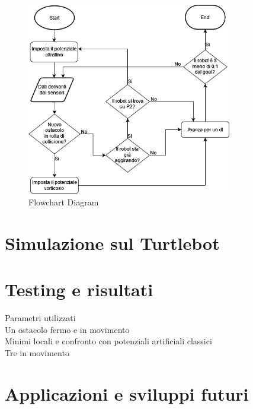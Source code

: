 \documentclass[14pt,twoside,a4paper]{extarticle}
\begin{document}
\begin{figure}[H]
\caption{Flowchart Diagram} \label{flow}
\centering
\includegraphics[width=0.8\textwidth]{flowchartDiagram.png}
\end{figure}

\section{Simulazione sul Turtlebot}

\section{Testing e risultati}
Parametri utilizzati\\
Un ostacolo fermo e in movimento\\
Minimi locali e confronto con potenziali artificiali classici\\
Tre in movimento\\

\section{Applicazioni e sviluppi futuri}

\newpage
\listoffigures
\printbibliography
\end{document}
